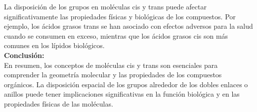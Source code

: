 \noindent La disposición de los grupos en moléculas cis y trans puede afectar significativamente las propiedades físicas y biológicas de los compuestos. Por ejemplo, los ácidos grasos trans se han asociado con efectos adversos para la salud cuando se consumen en exceso, mientras que los ácidos grasos cis son más comunes en los lípidos biológicos.\\

\noindent \textbf{Conclusión:} \\

\noindent En resumen, los conceptos de moléculas cis y trans son esenciales para comprender la geometría molecular y las propiedades de los compuestos orgánicos. La disposición espacial de los grupos alrededor de los dobles enlaces o anillos puede tener implicaciones significativas en la función biológica y en las propiedades físicas de las moléculas. \\



